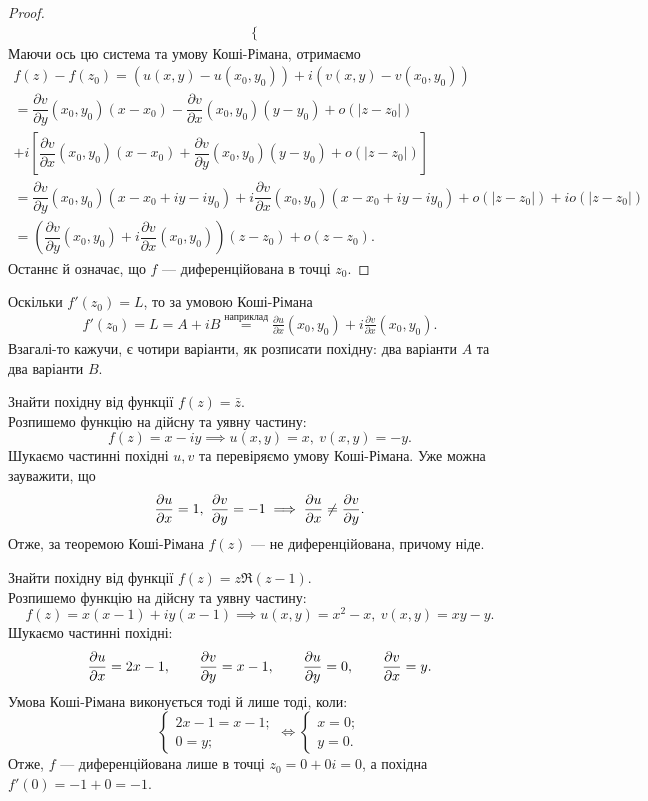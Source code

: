 \documentclass{math_library}
\begin{document}
\begin{proof}
\begin{align*}
\begin{cases}
\end{cases}
\end{align*}
Маючи ось цю система та умову Коші-Рімана, отримаємо
\begin{multline*}
f(z) - f(z_0) = (u(x,y) - u(x_0,y_0)) + i (v(x,y) - v(x_0,y_0)) \\
= \dfrac{\partial v}{\partial y}(x_0,y_0) (x-x_0) - \dfrac{\partial v}{\partial x}(x_0,y_0) (y-y_0) + o(|z-z_0|) \\
+ i \left[ \dfrac{\partial v}{\partial x}(x_0,y_0) (x-x_0) + \dfrac{\partial v}{\partial y}(x_0,y_0) (y-y_0) + o(|z-z_0|) \right] \\
 = \dfrac{\partial v}{\partial y}(x_0,y_0) (x - x_0 + iy - iy_0) + i \dfrac{\partial v}{\partial x}(x_0,y_0) (x - x_0 + iy - iy_0) + o(|z-z_0|) + i o(|z-z_0|) \\
 = \left( \dfrac{\partial v}{\partial y}(x_0,y_0) + i \dfrac{\partial v}{\partial x}(x_0,y_0) \right) (z-z_0) + o(z-z_0).
\end{multline*}
Останнє й означає, що $f$ --- диференційована в точці $z_0$.
\end{proof}

\begin{remark}
Оскільки $f'(z_0)=L$, то за умовою Коші-Рімана
\begin{align*}
	f'(z_0) = L = A+iB \overset{\text{наприклад}}{=} \frac{\partial u}{\partial x}(x_0,y_0) + i\frac{\partial v}{\partial x}(x_0,y_0).
\end{align*}
Взагалі-то кажучи, є чотири варіанти, як розписати похідну: два варіанти $A$ та два варіанти $B$.
\end{remark}

\begin{example}
Знайти похідну від функції $f(z) = \bar{z}$.\\
Розпишемо функцію на дійсну та уявну частину:
\[
f(z) = x-iy \implies u(x,y) = x,\ v(x,y) = -y.
\]
Шукаємо частинні похідні $u,v$ та перевіряємо умову Коші-Рімана. Уже можна зауважити, що
\[
\dfrac{\partial {u}}{\partial {x}} = 1,\ \dfrac{\partial {v}}{\partial {y}} = -1 \implies \dfrac{\partial {u}}{\partial {x}} \neq \dfrac{\partial {v}}{\partial {y}}.
\]
Отже, за теоремою Коші-Рімана $f(z)$ --- не диференційована, причому ніде.
\end{example}

\begin{example}
Знайти похідну від функції $f(z) = z \Re (z-1)$.\\
Розпишемо функцію на дійсну та уявну частину:
\[
f(z) = x(x-1) + iy(x-1) \implies u(x,y) = x^2-x,\ v(x,y) = xy-y.
\] 
Шукаємо частинні похідні:
\[
\dfrac{\partial {u}}{\partial {x}} = 2x-1, \qquad \dfrac{\partial {v}}{\partial {y}} = x-1, \qquad  \dfrac{\partial {u}}{\partial {y}} = 0, \qquad  \dfrac{\partial {v}}{\partial {x}} = y.
\]
Умова Коші-Рімана виконується тоді й лише тоді, коли:
\[
\begin{cases} 2x-1 = x-1; \\ 0 = y; \end{cases} \iff \begin{cases} x =0; \\ y = 0. \end{cases}
\]
Отже, $f$ --- диференційована лише в точці $z_0 = 0+0i = 0$, а похідна $f'(0) = -1+0 = -1$.
\end{example}
\end{document}
